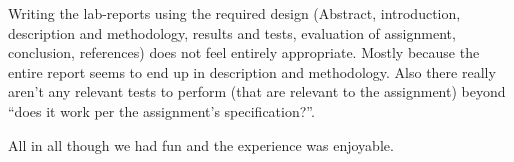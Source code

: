 Writing the lab-reports using the required design (Abstract, introduction, description and methodology, results and tests, evaluation of assignment, conclusion, references) does not feel entirely appropriate.
Mostly because the entire report seems to end up in description and methodology.
Also there really aren't any relevant tests to perform (that are relevant to the assignment) beyond ``does it work per the assignment's specification?''.

All in all though we had fun and the experience was enjoyable.